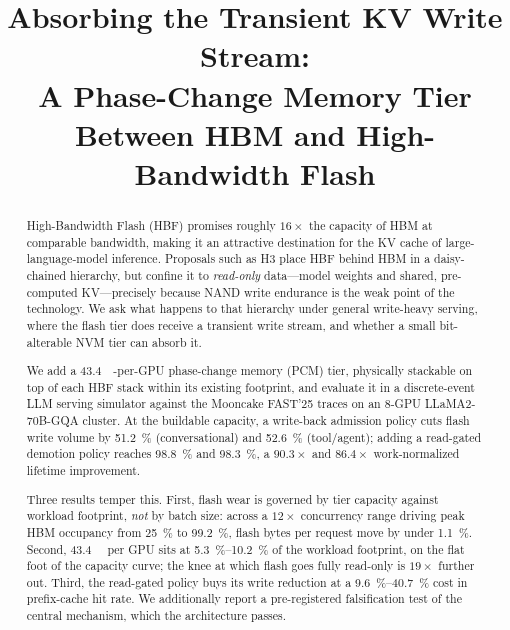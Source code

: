 \documentclass[conference]{IEEEtran}
\begin{document}
\title{Absorbing the Transient KV Write Stream:\\
A Phase-Change Memory Tier Between HBM and High-Bandwidth Flash}

\author{
}

\maketitle

\begin{abstract}
High-Bandwidth Flash (HBF) promises roughly $16\times$ the capacity of HBM at
comparable bandwidth, making it an attractive destination for the KV cache of
large-language-model inference. Proposals such as H3 place HBF behind HBM in a
daisy-chained hierarchy, but confine it to \emph{read-only} data---model weights
and shared, pre-computed KV---precisely because NAND write endurance is the
weak point of the technology. We ask what happens to that hierarchy under
general write-heavy serving, where the flash tier does receive a transient write
stream, and whether a small bit-alterable NVM tier can absorb it.

We add a \SI{43.4}{\gibi\byte}-per-GPU phase-change memory (PCM) tier,
physically stackable on top of each HBF stack within its existing footprint, and
evaluate it in a discrete-event LLM serving simulator against the Mooncake
FAST'25 traces on an 8-GPU LLaMA2-70B-GQA cluster. At the buildable capacity, a
write-back admission policy cuts flash write volume by \SI{51.2}{\percent}
(conversational) and \SI{52.6}{\percent} (tool/agent); adding a read-gated
demotion policy reaches \SI{98.8}{\percent} and \SI{98.3}{\percent}, a
$90.3\times$ and $86.4\times$ work-normalized lifetime improvement.

Three results temper this. First, flash wear is governed by tier capacity
against workload footprint, \emph{not} by batch size: across a $12\times$
concurrency range driving peak HBM occupancy from \SI{25}{\percent} to
\SI{99.2}{\percent}, flash bytes per request move by under
\SI{1.1}{\percent}. Second, \SI{43.4}{\gibi\byte} per GPU sits at
\SIrange{5.3}{10.2}{\percent} of the workload footprint, on the flat foot of the
capacity curve; the knee at which flash goes fully read-only is $19\times$
further out. Third, the read-gated policy buys its write reduction at a
\SIrange{9.6}{40.7}{\percent} cost in prefix-cache hit rate. We additionally
report a pre-registered falsification test of the central mechanism, which the
architecture passes.
\end{abstract}
\end{document}
